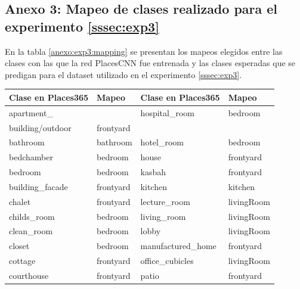 \subsection{Anexo 3: Mapeo de clases realizado para el experimento \ref{sssec:exp3}}\label{ssec:anexo3}
En la tabla \ref{anexo:exp3:mapping} se presentan los mapeos elegidos entre las clases con las que la red PlacesCNN fue entrenada y las clases esperadas que se predigan para el dataset utilizado en el experimento \ref{sssec:exp3}.
\begin{table}[h!]
	\noindent
	\begin{tabular}{||l|l||l|l||}
		\toprule                                                                                        		Clase en Places365 &       Mapeo & 		Clase en Places365 &       Mapeo \\                                                                                                       
		\midrule
		\midrule 
		apartment\_ &    {} &       hospital\_room &     bedroom \\
		building/outdoor &    frontyard &       {} &     {} \\
		\midrule                                                                                 
		bathroom &     bathroom &          hotel\_room &     bedroom \\
		\midrule
		bedchamber &      bedroom &               house &   frontyard \\
		\midrule                                                                                   
		bedroom &      bedroom &              kasbah &   frontyard \\      
		\midrule                                                                              
		building\_facade &    frontyard &             kitchen &     kitchen \\
		\midrule
		chalet &    frontyard &        lecture\_room &  livingRoom \\
		\midrule
		childs\_room &      bedroom &         living\_room &  livingRoom \\
		\midrule
		clean\_room &      bedroom &               lobby &  livingRoom \\
		\midrule
		closet &      bedroom &   manufactured\_home &   frontyard \\
		\midrule
		cottage &    frontyard &     office\_cubicles &  livingRoom \\
		\midrule
		courthouse &    frontyard &               patio &   frontyard \\
		\midrule

\end{tabular}
\end{table}
